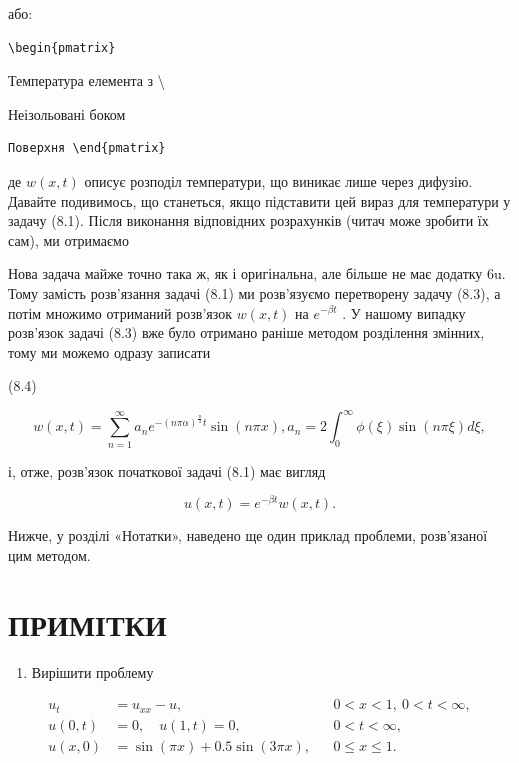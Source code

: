 \documentclass[
  ukrainian,
]{article}
\providecommand{\tightlist}{%
  \setlength{\itemsep}{0pt}\setlength{\parskip}{0pt}}
\begin{document}
або:

\begin{verbatim}
\begin{pmatrix}
\end{verbatim}

Температура елемента з \textbackslash{}

Неізольовані боком

\begin{verbatim}
Поверхня \end{pmatrix}
\end{verbatim}

де \(w(x, t)\) описує розподіл температури, що виникає лише через
дифузію. Давайте подивимось, що станеться, якщо підставити цей вираз для
температури у задачу (8.1). Після виконання відповідних розрахунків
(читач може зробити їх сам), ми отримаємо

Нова задача майже точно така ж, як і оригінальна, але більше не має
додатку 6u. Тому замість розв'язання задачі (8.1) ми розв'язуємо
перетворену задачу (8.3), а потім множимо отриманий розв'язок
\(w(x, t)\) на \(e^{-\beta t}\) . У нашому випадку розв'язок задачі
(8.3) вже було отримано раніше методом розділення змінних, тому ми
можемо одразу записати

(8.4)

\[
w(x, t) = \sum_{n=1}^{\infty} a_n e^{-(n\pi\alpha)^{\frac{n}{2}}t} \sin(n\pi x),
a_n = 2 \int_0^{\infty} \phi(\xi) \sin(n\pi \xi) d\xi,
\]

і, отже, розв'язок початкової задачі (8.1) має вигляд

\[
u(x, t) = e^{-\beta t}w(x, t).
\]

Нижче, у розділі «Нотатки», наведено ще один приклад проблеми,
розв'язаної цим методом.

\section{ПРИМІТКИ}\label{ux43fux440ux438ux43cux456ux442ux43aux438}

\begin{enumerate}
\def\labelenumi{\arabic{enumi}.}
\tightlist
\item
  Вирішити проблему
\end{enumerate}

\[
\begin{aligned}
u_t &= u_{xx} - u, && 0 < x < 1,\ 0 < t < \infty, \\
u(0,t) &= 0,\quad u(1,t) = 0, && 0 < t < \infty, \\
u(x,0) &= \sin(\pi x) + 0.5\sin(3\pi x), && 0 \leqslant x \leqslant 1.
\end{aligned}
\]
\end{document}
